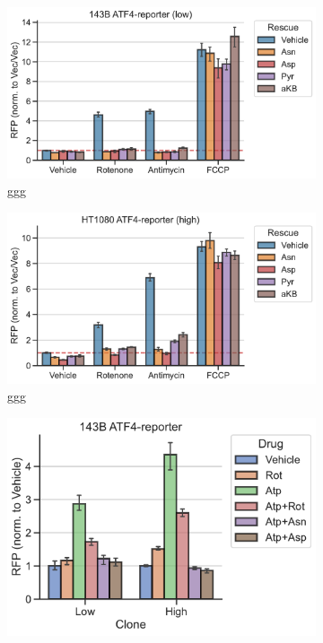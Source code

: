 \begin{figure}
     \centering
     \begin{subfigure}[b]{0.49\textwidth}
         \includegraphics[width=\textwidth]{figures/chap2/143B_ETCinhib_ATF4rep_low.pdf}
         \caption{ggg}
         \label{fig:ch2:143B_ETCinhib_ATF4rep_low}
     \end{subfigure}
     \hfill
     \begin{subfigure}[b]{0.49\textwidth}
         \includegraphics[width=\textwidth]{figures/chap2/HT1080_ETCinhib_ATF4rep_high.pdf}
         \caption{ggg}
         \label{fig:ch2:HT1080_ETCinhib_ATF4rep_high}
     \end{subfigure}
     \hfill
     \begin{subfigure}[b]{0.4\textwidth}
         \includegraphics[width=\textwidth]{figures/chap2/143B_Atp_ATF4rep.pdf}

\end{subfigure}
\end{figure}
